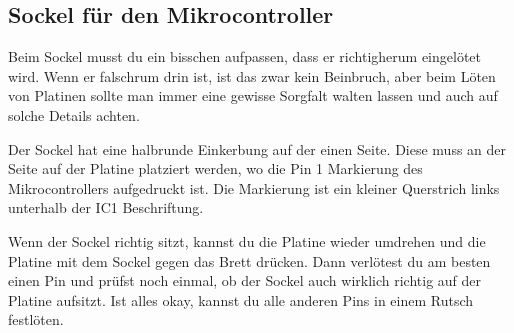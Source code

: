 \documentclass{article}
\begin{document}
\subsection{Sockel für den Mikrocontroller}

Beim Sockel musst du ein bisschen aufpassen, dass er richtigherum eingelötet wird. Wenn er falschrum drin ist, ist das zwar kein Beinbruch, aber beim Löten von Platinen sollte man immer eine gewisse Sorgfalt walten lassen und auch auf solche Details achten.

Der Sockel hat eine halbrunde Einkerbung auf der einen Seite. Diese muss an der Seite auf der Platine platziert werden, wo die Pin 1 Markierung des Mikrocontrollers aufgedruckt ist. Die Markierung ist ein kleiner Querstrich links unterhalb der IC1 Beschriftung.

Wenn der Sockel richtig sitzt, kannst du die Platine wieder umdrehen und die Platine mit dem Sockel gegen das Brett drücken. Dann verlötest du am besten einen Pin und prüfst noch einmal, ob der Sockel auch wirklich richtig auf der Platine aufsitzt. Ist alles okay, kannst du alle anderen Pins in einem Rutsch festlöten.

\vspace{1cm}
\end{document}
